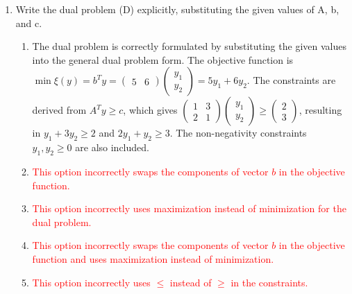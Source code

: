 \documentclass{article}%
\newcommand{\incorrect}[1]{\textcolor{red}{#1}}
\begin{document}
\begin{enumerate}
\begin{enumerate}
\item \incorrect{This is the objective function of the primal problem.}%
\end{enumerate}%
\vspace{1em}%
\item Write the dual problem (D) explicitly, substituting the given values of A, b, and c.%
\begin{enumerate}%
\item The dual problem is correctly formulated by substituting the given values into the general dual problem form. The objective function is $\min \xi(y) = b^T y = \begin{pmatrix} 5 & 6 \end{pmatrix} \begin{pmatrix} y_1 \\ y_2 \end{pmatrix} = 5y_1 + 6y_2$. The constraints are derived from $A^T y \ge c$, which gives $\begin{pmatrix} 1 & 3 \\ 2 & 1 \end{pmatrix} \begin{pmatrix} y_1 \\ y_2 \end{pmatrix} \ge \begin{pmatrix} 2 \\ 3 \end{pmatrix}$, resulting in $y_1 + 3y_2 \ge 2$ and $2y_1 + y_2 \ge 3$.  The non-negativity constraints $y_1, y_2 \ge 0$ are also included.%
\item \incorrect{This option incorrectly swaps the components of vector $b$ in the objective function.}%
\item \incorrect{This option incorrectly uses maximization instead of minimization for the dual problem.}%
\item \incorrect{This option incorrectly swaps the components of vector $b$ in the objective function and uses maximization instead of minimization.}%
\item \incorrect{This option incorrectly uses $\le$ instead of $\ge$ in the constraints.}%
\end{enumerate}%
\vspace{1em}%
\end{enumerate}

%
\end{document}
